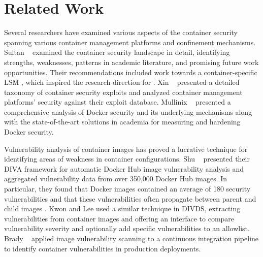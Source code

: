 \section{Related Work}
\label{sec:related}

Several researchers \cite{sultan2019_container_security,xin2018_container_security,mullinix2020_security_measures} have examined various aspects of the container security spanning various container management platforms and confinement mechanisms. Sultan \etal~\cite{sultan2019_container_security} examined the container security landscape in detail, identifying strengths, weaknesses, patterns in academic literature,  and promising future work opportunities. Their recommendations included work towards a container-specific LSM \cite{sultan2019_container_security}, which inspired the research direction for \bpfcontain{}. Xin \etal~\cite{xin2018_container_security} presented a detailed taxonomy of container security exploits and analyzed container management platforms' security against their exploit database. Mullinix \etal~\cite{mullinix2020_security_measures} presented a comprehensive analysis of Docker security and its underlying mechanisms along with the state-of-the-art solutions in academia for measuring and hardening Docker security.

Vulnerability analysis of container images \cite{shu2017_image_vuln,kwon2020_divds,brady2020_docker_cloud} has proved a lucrative technique for identifying areas of weakness in container configurations. Shu \etal~\cite{shu2017_image_vuln} presented their DIVA framework for automatic Docker Hub image vulnerability analysis and aggregated vulnerability data from over 350,000 Docker Hub images. In particular, they found that Docker images contained an average of 180 security vulnerabilities and that these vulnerabilities often propagate between parent and child images \cite{shu2017_image_vuln}. Kwon and Lee \cite{kwon2020_divds} used a similar technique in DIVDS, extracting vulnerabilities from container images and offering an interface to compare vulnerability severity and optionally add specific vulnerabilities to an allowlist. Brady \etal~\cite{brady2020_docker_cloud} applied image vulnerability scanning to a continuous integration pipeline to identify container vulnerabilities in production deployments.

